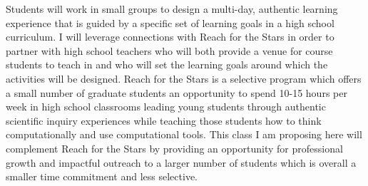 \documentclass[aasms,11pt]{article}
\begin{document}
Students will work in small groups to design a multi-day, authentic learning experience that is guided by a specific set of learning goals in a high school curriculum.
I will leverage connections with Reach for the Stars in order to partner with high school teachers who will both provide a venue for course students to teach in and who will set the learning goals around which the activities will be designed.
Reach for the Stars is a selective program which offers a small number of graduate students an opportunity to spend 10-15 hours per week in high school classrooms leading young students through authentic scientific inquiry experiences while teaching those students how to think computationally and use computational tools.
This class I am proposing here will complement Reach for the Stars by providing an opportunity for professional growth and impactful outreach to a larger number of students which is overall a smaller time commitment and less selective.
\end{document}
